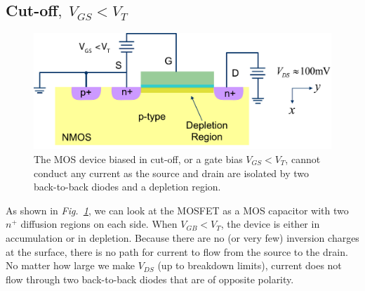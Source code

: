 \subsection{Cut-off\texorpdfstring{$,\;V_{GS}<V_T$}{}}
\begin{figure}[t]
\centering
\includegraphics[width=.75\columnwidth]{mos_cutoff}
\caption{The MOS device biased in cut-off, or a gate bias $V_{GS} < V_T$, cannot conduct any current as the source and drain are isolated by two back-to-back diodes and a depletion region.}
\label{fig:mos_cutoff}
\end{figure}
As shown in \emph{Fig.~\ref{fig:mos_cutoff}}, we can look at the MOSFET as a MOS capacitor with two $n^+$ diffusion regions on each side. When $V_{GB} < V_T$, the device is either in accumulation or in depletion.  Because there are no (or very few) inversion charges at the surface, there is no path for current to flow from the source to the drain.  No matter how large we make $V_{DS}$ (up to breakdown limits), current does not flow through two back-to-back diodes that are of opposite polarity.
